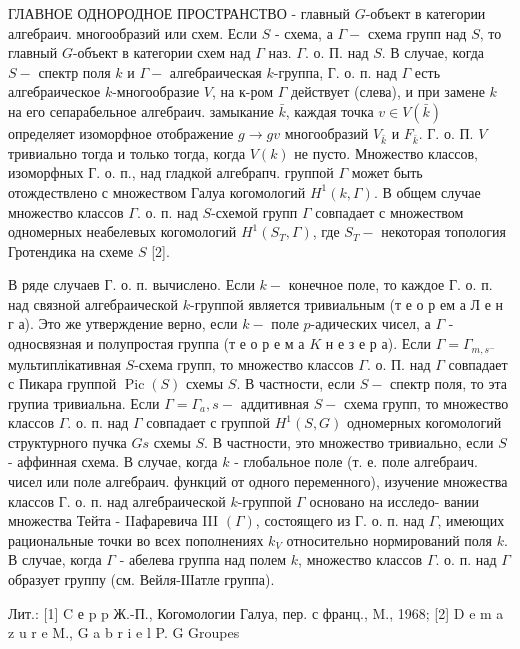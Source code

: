 \documentclass[10pt]{article}
\begin{document}
ГЛАВНОЕ ОДНОРОДНОЕ ПРОСТРАНСТВО - главный $G$-объект в категории алгебраич. многообразий или схем. Если $S$ - схема, а $\Gamma-$ схема групп над $S$, то главный $G$-объект в категории схем над $\Gamma$ наз. $\Gamma$. о. П. над $S$. В случае, когда $S-$ спектр поля $k$ и $\Gamma-$ алгебраическая $k$-группа, Г. о. п. над $\Gamma$ есть алгебраическое $k$-многообразие $V$, на к-ром $\Gamma$ действует (слева), и при замене $k$ на его сепарабельное алгебраич. замыкание $\bar{k}$, каждая точка $v \in V(\bar{k})$ определяет изоморфное отображение $g \rightarrow g v$ многообразий $V_{\bar{k}}$ и $F_{\bar{k}}$. Г. о. П. $V$ тривиально тогда и только тогда, когда $V(k)$ не пусто. Множество классов, изоморфных Г. о. п., над гладкой алгебрапч. группой $\Gamma$ может быть отождествлено с множеством Галуа когомологий $H^{1}(k, \Gamma)$. В общем случае множество классов $\Gamma$. о. п. над $S$-схемой групп $\Gamma$ совпадает с множеством одномерных неабелевых когомологий $H^{1}\left(S_{T}, \Gamma\right)$, где $S_{T}-$ некоторая топология Гротендика на схеме $S$ [2].



В ряде случаев Г. о. п. вычислено. Если $k-$ конечное поле, то каждое Г. о. п. над связной алгебраической $k$-группой является тривиальным (т е о р ем а Л е н г а). Это же утверждение верно, если $k-$ поле $p$-адических чисел, а $\Gamma$ - односвязная и полупростая группа (т е о р е м а $K$ н е з е р а). Если $\Gamma=\Gamma_{m, s^{-}}$ мультиплікативная $S$-схема групп, то множество классов $\Gamma$. о. П. над $\Gamma$ совпадает с Пикара группой $\operatorname{Pic}(S)$ схемы $S$. В частности, если $S-$ спектр поля, то эта групиа тривиальна. Если $\Gamma=\Gamma_{a}, s-$ аддитивная $S-$ схема групп, то множество классов $\Gamma$. о. п. над $\Gamma$ совпадает с группой $H^{1}(S, G)$ одномерных когомологий структурного пучка $G s$ схемы $S$. В частности, это множество тривиально, если $S$ - аффинная схема. В случае, когда $k$ - глобальное поле (т. е. поле алгебраич. чисел или поле алгебраич. функций от одного переменного), изучение множества классов Г. о. п. над алгебраической $k$-группой $\Gamma$ основано на исследо- вании множества Тейта - IIафаревича III $(\Gamma)$, состоящего из Г. о. п. над $\Gamma$, имеющих рациональные точки во всех пополнениях $k_{V}$ относительно нормирований поля $k$. В случае, когда $\Gamma$ - абелева группа над полем $k$, множество классов $\Gamma$. о. п. над $\Gamma$ образует группу (см. Вейля-ІІІатле группа).



Лит.: [1] C е p p Ж.-П., Когомологии Галуа, пер. с франц., M., 1968; [2] D e m a z u r e M., G a b r i e l P. G Groupes
\end{document}

